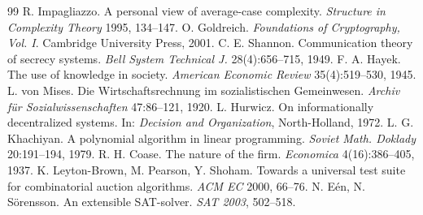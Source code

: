 \documentclass[a4paper,12pt]{article}
\theoremstyle{definition}
\begin{document}
\begin{thebibliography}{99}
 R. Impagliazzo. A personal view of average-case complexity. \emph{Structure in Complexity Theory} 1995, 134--147.
 O. Goldreich. \emph{Foundations of Cryptography, Vol. I}. Cambridge University Press, 2001.
 C. E. Shannon. Communication theory of secrecy systems. \emph{Bell System Technical J.} 28(4):656--715, 1949.
 F. A. Hayek. The use of knowledge in society. \emph{American Economic Review} 35(4):519--530, 1945.
 L. von Mises. Die Wirtschaftsrechnung im sozialistischen Gemeinwesen. \emph{Archiv für Sozialwissenschaften} 47:86--121, 1920.
 L. Hurwicz. On informationally decentralized systems. In: \emph{Decision and Organization}, North-Holland, 1972.
 L. G. Khachiyan. A polynomial algorithm in linear programming. \emph{Soviet Math. Doklady} 20:191--194, 1979.
 R. H. Coase. The nature of the firm. \emph{Economica} 4(16):386--405, 1937.
 K. Leyton-Brown, M. Pearson, Y. Shoham. Towards a universal test suite for combinatorial auction algorithms. \emph{ACM EC} 2000, 66--76.
 N. Eén, N. Sörensson. An extensible SAT-solver. \emph{SAT 2003}, 502--518.
\end{thebibliography}
\end{document}
